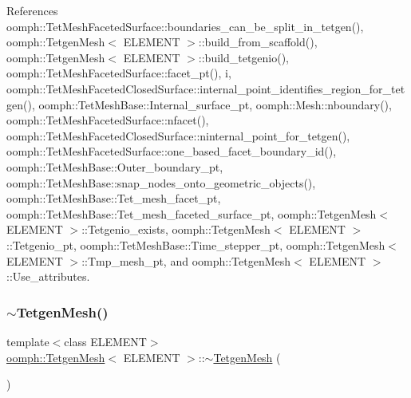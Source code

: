 References oomph\+::\+Tet\+Mesh\+Faceted\+Surface\+::boundaries\+\_\+can\+\_\+be\+\_\+split\+\_\+in\+\_\+tetgen(), oomph\+::\+Tetgen\+Mesh$<$ E\+L\+E\+M\+E\+N\+T $>$\+::build\+\_\+from\+\_\+scaffold(), oomph\+::\+Tetgen\+Mesh$<$ E\+L\+E\+M\+E\+N\+T $>$\+::build\+\_\+tetgenio(), oomph\+::\+Tet\+Mesh\+Faceted\+Surface\+::facet\+\_\+pt(), i, oomph\+::\+Tet\+Mesh\+Faceted\+Closed\+Surface\+::internal\+\_\+point\+\_\+identifies\+\_\+region\+\_\+for\+\_\+tetgen(), oomph\+::\+Tet\+Mesh\+Base\+::\+Internal\+\_\+surface\+\_\+pt, oomph\+::\+Mesh\+::nboundary(), oomph\+::\+Tet\+Mesh\+Faceted\+Surface\+::nfacet(), oomph\+::\+Tet\+Mesh\+Faceted\+Closed\+Surface\+::ninternal\+\_\+point\+\_\+for\+\_\+tetgen(), oomph\+::\+Tet\+Mesh\+Faceted\+Surface\+::one\+\_\+based\+\_\+facet\+\_\+boundary\+\_\+id(), oomph\+::\+Tet\+Mesh\+Base\+::\+Outer\+\_\+boundary\+\_\+pt, oomph\+::\+Tet\+Mesh\+Base\+::snap\+\_\+nodes\+\_\+onto\+\_\+geometric\+\_\+objects(), oomph\+::\+Tet\+Mesh\+Base\+::\+Tet\+\_\+mesh\+\_\+facet\+\_\+pt, oomph\+::\+Tet\+Mesh\+Base\+::\+Tet\+\_\+mesh\+\_\+faceted\+\_\+surface\+\_\+pt, oomph\+::\+Tetgen\+Mesh$<$ E\+L\+E\+M\+E\+N\+T $>$\+::\+Tetgenio\+\_\+exists, oomph\+::\+Tetgen\+Mesh$<$ E\+L\+E\+M\+E\+N\+T $>$\+::\+Tetgenio\+\_\+pt, oomph\+::\+Tet\+Mesh\+Base\+::\+Time\+\_\+stepper\+\_\+pt, oomph\+::\+Tetgen\+Mesh$<$ E\+L\+E\+M\+E\+N\+T $>$\+::\+Tmp\+\_\+mesh\+\_\+pt, and oomph\+::\+Tetgen\+Mesh$<$ E\+L\+E\+M\+E\+N\+T $>$\+::\+Use\+\_\+attributes.

\mbox{\label{classoomph_1_1TetgenMesh_a9a83c64b6481463161f6eb87f347ee9e}} 
\subsubsection{\texorpdfstring{$\sim$\+Tetgen\+Mesh()}{~TetgenMesh()}}
{\footnotesize\ttfamily template$<$class E\+L\+E\+M\+E\+NT$>$ \\
\hyperlink{classoomph_1_1TetgenMesh}{oomph\+::\+Tetgen\+Mesh}$<$ E\+L\+E\+M\+E\+NT $>$\+::$\sim$\hyperlink{classoomph_1_1TetgenMesh}{Tetgen\+Mesh} (\begin{DoxyParamCaption}{ }\end{DoxyParamCaption})\hspace{0.3cm}{\ttfamily [inline]}}



